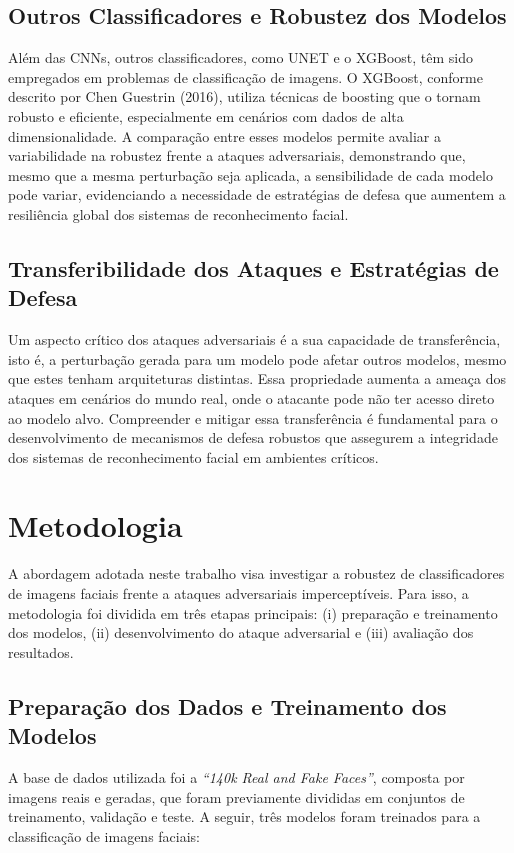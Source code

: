 \documentclass[12pt]{article}
\begin{document}
\subsection{Outros Classificadores e Robustez dos Modelos}
Além das CNNs, outros classificadores, como UNET e o XGBoost, têm sido
empregados em problemas de classificação de imagens. O XGBoost, conforme
descrito por Chen Guestrin (2016), utiliza técnicas de boosting que o tornam
robusto e eficiente, especialmente em cenários com dados de alta
dimensionalidade. A comparação entre esses modelos permite avaliar a
variabilidade na robustez frente a ataques adversariais, demonstrando que,
mesmo que a mesma perturbação seja aplicada, a sensibilidade de cada modelo
pode variar, evidenciando a necessidade de estratégias de defesa que aumentem a
resiliência global dos sistemas de reconhecimento facial.

\subsection{Transferibilidade dos Ataques e Estratégias de Defesa}
Um aspecto crítico dos ataques adversariais é a sua capacidade de
transferência, isto é, a perturbação gerada para um modelo pode afetar outros
modelos, mesmo que estes tenham arquiteturas distintas. Essa propriedade
aumenta a ameaça dos ataques em cenários do mundo real, onde o atacante pode
não ter acesso direto ao modelo alvo. Compreender e mitigar essa transferência
é fundamental para o desenvolvimento de mecanismos de defesa robustos que
assegurem a integridade dos sistemas de reconhecimento facial em ambientes
críticos.

\section{Metodologia}

A abordagem adotada neste trabalho visa investigar a robustez de
classificadores de imagens faciais frente a ataques adversariais
imperceptíveis. Para isso, a metodologia foi dividida em três etapas
principais: (i) preparação e treinamento dos modelos, (ii) desenvolvimento do
ataque adversarial e (iii) avaliação dos resultados.

\subsection{Preparação dos Dados e Treinamento dos Modelos}

A base de dados utilizada foi a \textit{``140k Real and Fake Faces''}, composta
por imagens reais e geradas, que foram previamente divididas em conjuntos de
treinamento, validação e teste. A seguir, três modelos foram treinados para a
classificação de imagens faciais:
\end{document}
